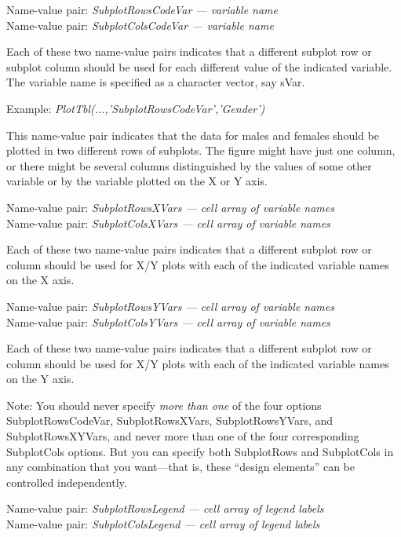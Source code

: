 \documentclass{article}
\newcommand{\example}[1]{Example: {\it #1}}
\newcommand{\namevalue}[2]{{\it #1 --- #2}}
\begin{document}
Name-value pair: \namevalue{SubplotRowsCodeVar}{variable name} \\
Name-value pair: \namevalue{SubplotColsCodeVar}{variable name}

Each of these two name-value pairs indicates that a different subplot row or subplot
column should be used for each different value of the indicated variable.
The variable name is specified as a character vector, say sVar.

\example{PlotTbl(...,'SubplotRowsCodeVar','Gender')}

This name-value pair indicates that the data for males and females should be plotted in two
different rows of subplots.
The figure might have just one column, or there might be several columns distinguished by the
values of some other variable or by the variable plotted on the X or Y axis.

Name-value pair: \namevalue{SubplotRowsXVars}{cell array of variable names} \\
Name-value pair: \namevalue{SubplotColsXVars}{cell array of variable names}

Each of these two name-value pairs indicates that a different subplot row or column should
be used for X/Y plots with each of the indicated variable names on the X axis.

Name-value pair: \namevalue{SubplotRowsYVars}{cell array of variable names} \\
Name-value pair: \namevalue{SubplotColsYVars}{cell array of variable names}

Each of these two name-value pairs indicates that a different subplot row or column should
be used for X/Y plots with each of the indicated variable names on the Y axis.

Note: You should never specify \emph{more than one} of the four options
SubplotRowsCodeVar, SubplotRowsXVars, SubplotRowsYVars, and SubplotRowsXYVars,
and never more than one of the four corresponding SubplotCols options.
But you can specify both SubplotRows and SubplotCols in any
combination that you want---that is, these ``design elements''
can be controlled independently.


Name-value pair: \namevalue{SubplotRowsLegend}{cell array of legend labels} \\
Name-value pair: \namevalue{SubplotColsLegend}{cell array of legend labels}
\end{document}

